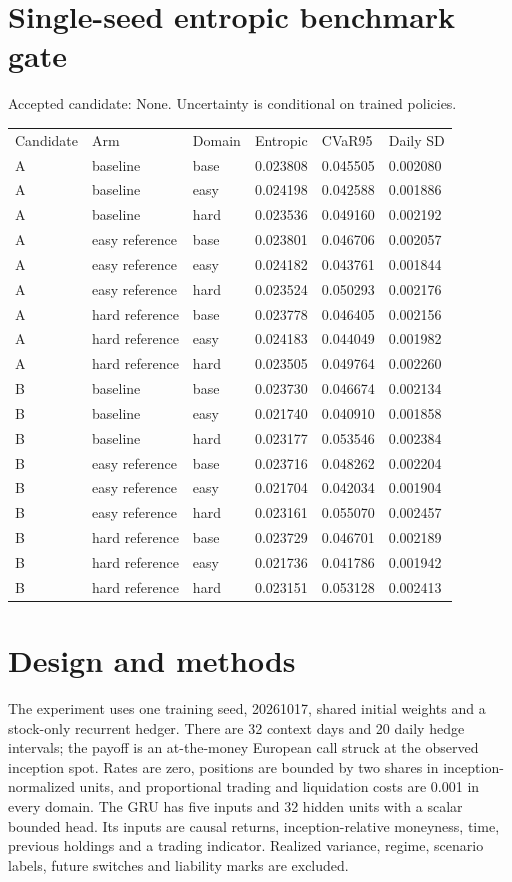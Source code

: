 \documentclass{article}
\begin{document}
\section*{Single-seed entropic benchmark gate}
Accepted candidate: None. Uncertainty is conditional on trained policies.
\begin{tabular}{llllll}
Candidate & Arm & Domain & Entropic & CVaR95 & Daily SD \\
A & baseline & base & 0.023808 & 0.045505 & 0.002080 \\
A & baseline & easy & 0.024198 & 0.042588 & 0.001886 \\
A & baseline & hard & 0.023536 & 0.049160 & 0.002192 \\
A & easy reference & base & 0.023801 & 0.046706 & 0.002057 \\
A & easy reference & easy & 0.024182 & 0.043761 & 0.001844 \\
A & easy reference & hard & 0.023524 & 0.050293 & 0.002176 \\
A & hard reference & base & 0.023778 & 0.046405 & 0.002156 \\
A & hard reference & easy & 0.024183 & 0.044049 & 0.001982 \\
A & hard reference & hard & 0.023505 & 0.049764 & 0.002260 \\
B & baseline & base & 0.023730 & 0.046674 & 0.002134 \\
B & baseline & easy & 0.021740 & 0.040910 & 0.001858 \\
B & baseline & hard & 0.023177 & 0.053546 & 0.002384 \\
B & easy reference & base & 0.023716 & 0.048262 & 0.002204 \\
B & easy reference & easy & 0.021704 & 0.042034 & 0.001904 \\
B & easy reference & hard & 0.023161 & 0.055070 & 0.002457 \\
B & hard reference & base & 0.023729 & 0.046701 & 0.002189 \\
B & hard reference & easy & 0.021736 & 0.041786 & 0.001942 \\
B & hard reference & hard & 0.023151 & 0.053128 & 0.002413 \\
\end{tabular}
\section*{Design and methods}
The experiment uses one training seed, 20261017, shared initial weights and a stock-only recurrent hedger. There are 32 context days and 20 daily hedge intervals; the payoff is an at-the-money European call struck at the observed inception spot. Rates are zero, positions are bounded by two shares in inception-normalized units, and proportional trading and liquidation costs are 0.001 in every domain. The GRU has five inputs and 32 hidden units with a scalar bounded head. Its inputs are causal returns, inception-relative moneyness, time, previous holdings and a trading indicator. Realized variance, regime, scenario labels, future switches and liability marks are excluded.
\end{document}
